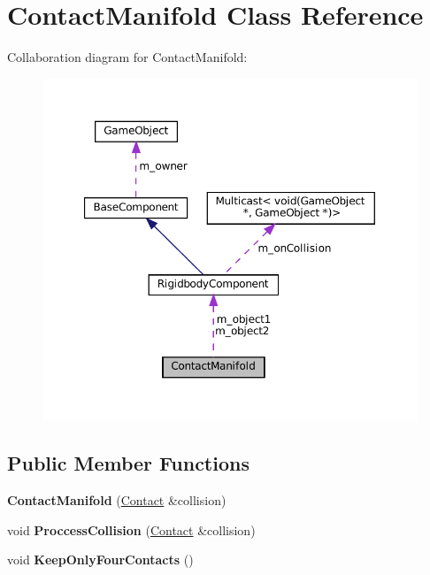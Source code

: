 \hypertarget{classContactManifold}{}\section{Contact\+Manifold Class Reference}
\label{classContactManifold}


Collaboration diagram for Contact\+Manifold\+:\nopagebreak
\begin{figure}[H]
\begin{center}
\leavevmode
\includegraphics[width=350pt]{classContactManifold__coll__graph}
\end{center}
\end{figure}
\subsection*{Public Member Functions}
\begin{DoxyCompactItemize}
\item 
\mbox{\label{classContactManifold_a5f97e21f2f679383c0484fb03064d4ac}} 
{\bfseries Contact\+Manifold} (\hyperlink{classContact}{Contact} \&collision)
\item 
\mbox{\label{classContactManifold_ab435616e119010a5904ff0833519bf52}} 
void {\bfseries Proccess\+Collision} (\hyperlink{classContact}{Contact} \&collision)
\item 
\mbox{\label{classContactManifold_a6fdcb82f3b35f2d9e7f5d6710a6c3119}} 
void {\bfseries Keep\+Only\+Four\+Contacts} ()
\end{DoxyCompactItemize}
